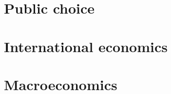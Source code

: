 \documentclass[oneside]{book}
\begin{document}
\part{Public choice}









\part{International economics}



\part{Macroeconomics}




\end{document}
